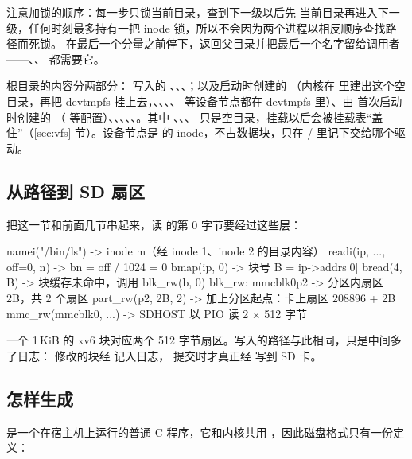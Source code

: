 注意加锁的顺序：每一步只锁当前目录，查到下一级以后先  当前目录再进入下一级，任何时刻最多持有一把 inode 锁，所以不会因为两个进程以相反顺序查找路径而死锁。 在最后一个分量之前停下，返回父目录并把最后一个名字留给调用者——、、 都需要它。

根目录的内容分两部分： 写入的 、、、；以及启动时创建的 （内核在  里建出这个空目录，再把 devtmpfs 挂上去，、、、、 等设备节点都在 devtmpfs 里）、由  首次启动时创建的 （ 等配置）、、、、、。其中 、、、 只是空目录，挂载以后会被挂载表“盖住”（\ref{sec:vfs} 节）。设备节点是  的 inode，不占数据块，只在 / 里记下交给哪个驱动。

\subsection{从路径到 SD 扇区}

把这一节和前面几节串起来，读  的第 0 字节要经过这些层：

\begin{txtcode}
namei("/bin/ls")             -> inode m（经 inode 1、inode 2 的目录内容）
readi(ip, ..., off=0, n)     -> bn = off / 1024 = 0
bmap(ip, 0)                  -> 块号 B = ip->addrs[0]
bread(4, B)                  -> 块缓存未命中，调用 blk_rw(b, 0)
blk_rw: mmcblk0p2            -> 分区内扇区 2B，共 2 个扇区
part_rw(p2, 2B, 2)           -> 加上分区起点：卡上扇区 208896 + 2B
mmc_rw(mmcblk0, ...)         -> SDHOST 以 PIO 读 2 × 512 字节
\end{txtcode}

一个 1\,KiB 的 xv6 块对应两个 512 字节扇区。写入的路径与此相同，只是中间多了日志： 修改的块经  记入日志， 提交时才真正经  写到 SD 卡。

\subsection{ 怎样生成 }

 是一个在宿主机上运行的普通 C 程序，它和内核共用 ，因此磁盘格式只有一份定义：

